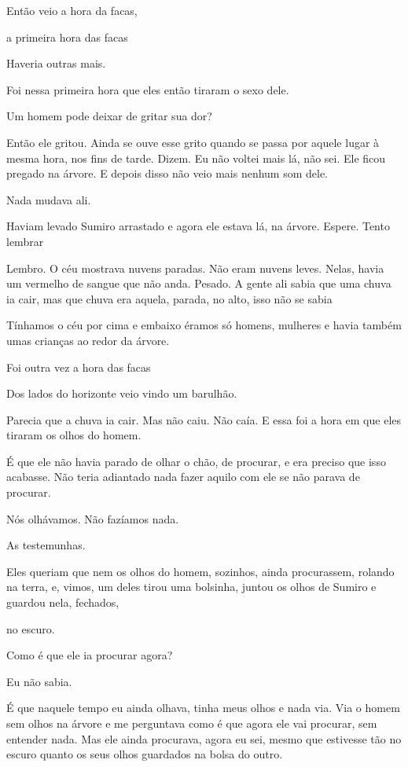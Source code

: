 Então veio a hora da facas,

a primeira hora das facas

Haveria outras mais.

Foi nessa primeira hora que eles então tiraram o sexo dele.

Um homem pode deixar de gritar sua dor?

Então ele gritou. Ainda se ouve esse grito quando se passa por aquele
lugar à mesma hora, nos fins de tarde. Dizem. Eu não voltei mais lá, não
sei. Ele ficou pregado na árvore. E depois disso não veio mais nenhum
som dele.

Nada mudava ali.

Haviam levado Sumiro arrastado e agora ele estava lá, na árvore. Espere.
Tento lembrar

Lembro. O céu mostrava nuvens paradas. Não eram nuvens leves. Nelas,
havia um vermelho de sangue que não anda. Pesado. A gente ali sabia que
uma chuva ia cair, mas que chuva era aquela, parada, no alto, isso não
se sabia

Tínhamos o céu por cima e embaixo éramos só homens, mulheres e havia
também umas crianças ao redor da árvore.

Foi outra vez a hora das facas

Dos lados do horizonte veio vindo um barulhão.

Parecia que a chuva ia cair. Mas não caiu. Não caía. E essa foi a hora
em que eles tiraram os olhos do homem.

É que ele não havia parado de olhar o chão, de procurar, e era preciso
que isso acabasse. Não teria adiantado nada fazer aquilo com ele se não
parava de procurar.

Nós olhávamos. Não fazíamos nada.

As testemunhas.

Eles queriam que nem os olhos do homem, sozinhos, ainda procurassem,
rolando na terra, e, vimos, um deles tirou uma bolsinha, juntou os olhos
de Sumiro e guardou nela, fechados,

no escuro.

Como é que ele ia procurar agora?

Eu não sabia.

É que naquele tempo eu ainda olhava, tinha meus olhos e nada via. Via o
homem sem olhos na árvore e me perguntava como é que agora ele vai
procurar, sem entender nada. Mas ele ainda procurava, agora eu sei,
mesmo que estivesse tão no escuro quanto os seus olhos guardados na
bolsa do outro.\\

